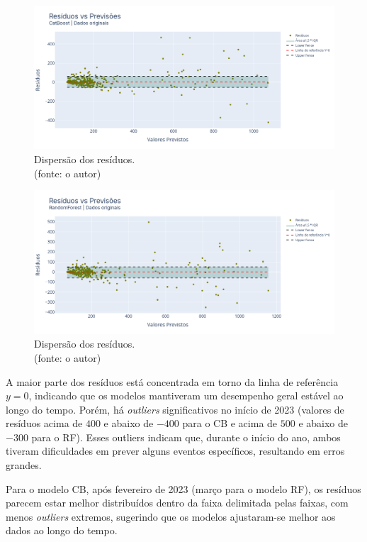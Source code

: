 \begin{figure}[!h]
\centering
\includegraphics[scale=0.33]{Figuras/jequiti/resultados/CB_WFV_ORIG_RESID_x_PREV.png}
\caption{Dispersão dos resíduos.\\(fonte: o autor)}
\label{fig:jequiti_CB_WFV_ORIG_RESID_x_PREV}
\end{figure}

\begin{figure}[!h]
\centering
\includegraphics[scale=0.33]{Figuras/jequiti/resultados/RF_WFV_ORIG_RESID_x_PREV.png}
\caption{Dispersão dos resíduos.\\(fonte: o autor)}
\label{fig:jequiti_RF_WFV_ORIG_RESID_x_PREV}
\end{figure}
\clearpage

A maior parte dos resíduos está concentrada em torno da linha de referência $y=0$, indicando que os modelos mantiveram um desempenho geral estável ao longo do tempo. Porém, há \textit{outliers} significativos no início de 2023 (valores de resíduos acima de $400$ e abaixo de $-400$ para o CB e acima de $500$ e abaixo de $-300$ para o RF). Esses outliers indicam que, durante o início do ano, ambos tiveram dificuldades em prever alguns eventos específicos, resultando em erros grandes.

Para o modelo CB, após fevereiro de 2023 (março para o modelo RF), os resíduos parecem estar melhor distribuídos dentro da faixa delimitada pelas faixas, com menos \textit{outliers} extremos, sugerindo que os modelos ajustaram-se melhor aos dados ao longo do tempo.

